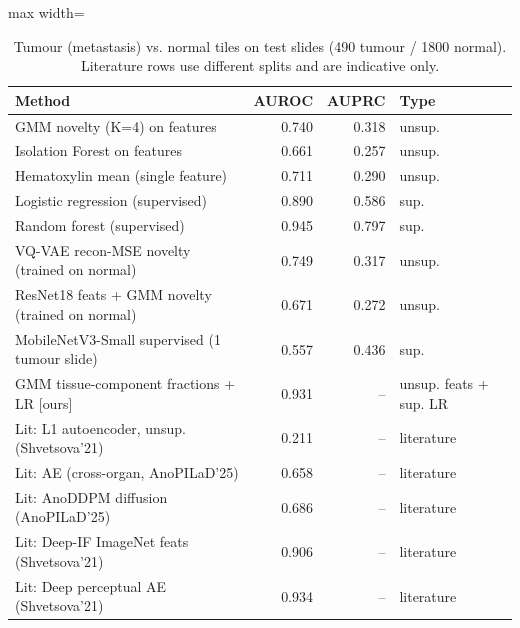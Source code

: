 \begin{table}[H]\centering\small
\caption{Tumour (metastasis) vs. normal tiles on test slides (490 tumour / 1800 normal). Literature rows use different splits and are indicative only.}\label{tab:tumour}
\begin{adjustbox}{max width=\linewidth}\begin{tabular}{p{8.2cm}rrl}\toprule
\textbf{Method} & \textbf{AUROC} & \textbf{AUPRC} & \textbf{Type} \\\midrule
GMM novelty (K=4) on features & 0.740 & 0.318 & unsup. \\
Isolation Forest on features & 0.661 & 0.257 & unsup. \\
Hematoxylin mean (single feature) & 0.711 & 0.290 & unsup. \\
Logistic regression (supervised) & 0.890 & 0.586 & sup. \\
Random forest (supervised) & 0.945 & 0.797 & sup. \\
VQ-VAE recon-MSE novelty (trained on normal) & 0.749 & 0.317 & unsup. \\
ResNet18 feats + GMM novelty (trained on normal) & 0.671 & 0.272 & unsup. \\
MobileNetV3-Small supervised (1 tumour slide) & 0.557 & 0.436 & sup. \\
GMM tissue-component fractions + LR {[}ours{]} & 0.931 & -- & unsup. feats + sup. LR \\
\midrule
Lit: L1 autoencoder, unsup. (Shvetsova'21) & 0.211 & -- & literature \\
Lit: AE (cross-organ, AnoPILaD'25) & 0.658 & -- & literature \\
Lit: AnoDDPM diffusion (AnoPILaD'25) & 0.686 & -- & literature \\
Lit: Deep-IF ImageNet feats (Shvetsova'21) & 0.906 & -- & literature \\
Lit: Deep perceptual AE (Shvetsova'21) & 0.934 & -- & literature \\
\bottomrule\end{tabular}\end{adjustbox}\end{table}